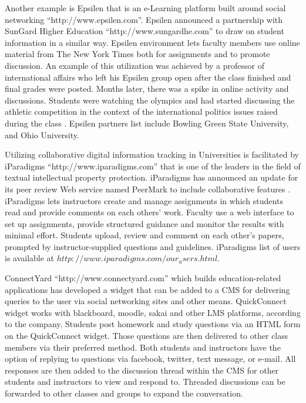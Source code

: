 \documentclass[12pt,a4paper,final,twoside,onecolumn,titlepage]{book}
\begin{document}
Another example is Epsilen that is an e-Learning platform built around social networking “http://www.epsilen.com”. Epsilen announced a partnership with SunGard Higher Education “http://www.sungardhe.com” to draw on student information in a similar way. Epsilen environment lets faculty members use online material from The New York Times both for assignments and to promote discussion. An example of this utilization was achieved by a professor of international affairs who left his Epsilen group open after the class finished and final grades were posted. Months later, there was a spike in online activity and discussions. Students were watching the olympics and had started discussing the athletic competition in the context of the international politics issues raised during the class \cite{W13}. Epsilen partners list include Bowling Green State University, and Ohio University.

Utilizing collaborative digital information tracking in Universities is facilitated by iParadigms “http://www.iparadigms.com” that is one of the leaders in the field of textual intellectual property protection. iParadigms has announced an update for its peer review Web service named PeerMark to include collaborative features \cite{W14}. iParadigms lets instructors create and manage assignments in which students read and provide comments on each others' work. Faculty use a web interface to set up assignments, provide structured guidance and monitor the results with minimal effort. Students upload, review and comment on each other's papers, prompted by instructor-supplied questions and guidelines. iParadigms list of users is available at $http://www.iparadigms.com/
our_users.html$.

ConnectYard “http://www.connectyard.com” which builds education-related applications has developed a widget that can be added to a \gls{CMS} for delivering queries to the user via social networking sites and other means. QuickConnect widget works with blackboard, moodle, sakai and other \gls{LMS} platforms, according to the company. Students post homework and study questions via an HTML form on the QuickConnect widget. Those questions are then delivered to other class members via their preferred method. Both students and instructors have the option of replying to questions via facebook, twitter, text message, or e-mail. All responses are then added to the discussion thread within the \gls{CMS} for other students and instructors to view and respond to. Threaded discussions can be forwarded to other classes and groups to expand the conversation.
\end{document}
